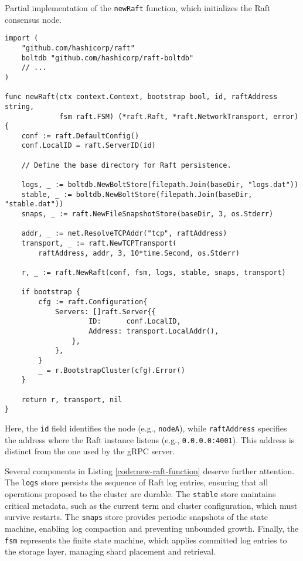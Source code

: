 \begin{listing}[H]
\caption{Partial implementation of the \texttt{newRaft} function, which initializes the Raft consensus node.}
\label{code:new-raft-function}
\begin{verbatim}
import (
    "github.com/hashicorp/raft"
    boltdb "github.com/hashicorp/raft-boltdb"
    // ...
)

func newRaft(ctx context.Context, bootstrap bool, id, raftAddress string,
             fsm raft.FSM) (*raft.Raft, *raft.NetworkTransport, error) {
    conf := raft.DefaultConfig()
    conf.LocalID = raft.ServerID(id)

    // Define the base directory for Raft persistence.

    logs, _ := boltdb.NewBoltStore(filepath.Join(baseDir, "logs.dat"))
    stable, _ := boltdb.NewBoltStore(filepath.Join(baseDir, "stable.dat"))
    snaps, _ := raft.NewFileSnapshotStore(baseDir, 3, os.Stderr)

    addr, _ := net.ResolveTCPAddr("tcp", raftAddress)
    transport, _ := raft.NewTCPTransport(
        raftAddress, addr, 3, 10*time.Second, os.Stderr)

    r, _ := raft.NewRaft(conf, fsm, logs, stable, snaps, transport)

    if bootstrap {
        cfg := raft.Configuration{
            Servers: []raft.Server{{
                    ID:      conf.LocalID,
                    Address: transport.LocalAddr(),
                },
            },
        }
        _ = r.BootstrapCluster(cfg).Error()
    }

    return r, transport, nil
}
\end{verbatim}
\end{listing}

Here, the \texttt{id} field identifies the node (e.g., \texttt{nodeA}), while \texttt{raftAddress} specifies the address where the Raft instance listens (e.g., \texttt{0.0.0.0:4001}). This address is distinct from the one used by the gRPC server.

Several components in Listing \ref{code:new-raft-function} deserve further attention.  
The \texttt{logs} store persists the sequence of Raft log entries, ensuring that all operations proposed to the cluster are durable. The \texttt{stable} store maintains critical metadata, such as the current term and cluster configuration, which must survive restarts. The \texttt{snaps} store provides periodic snapshots of the state machine, enabling log compaction and preventing unbounded growth. Finally, the \texttt{fsm} represents the finite state machine, which applies committed log entries to the storage layer, managing shard placement and retrieval.  

